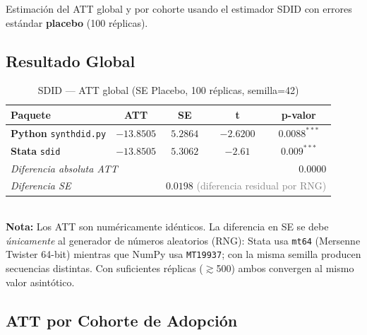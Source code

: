 \documentclass[11pt, a4paper]{article}
\newcommand{\py}{\textcolor{pyblue}{\textbf{Python}}}
\newcommand{\st}{\textcolor{stgreen}{\textbf{Stata}}}
\begin{document}
Estimación del ATT global y por cohorte usando el estimador SDID con errores estándar \textbf{placebo} (100 réplicas).

\subsection{Resultado Global}

\begin{table}[H]
\centering
\caption{SDID --- ATT global (SE Placebo, 100 réplicas, semilla=42)}
\begin{tabular}{lcccc}
\toprule
\textbf{Paquete} & \textbf{ATT} & \textbf{SE} & \textbf{t} & \textbf{p-valor} \\
\midrule
\rowcolor{headgray}
\py{} \texttt{synthdid.py} & $-13.8505$ & $5.2864$ & $-2.6200$ & $0.0088^{***}$ \\
\st{} \texttt{sdid}         & $-13.8505$ & $5.3062$ & $-2.61$   & $0.009^{***}$ \\
\midrule
\multicolumn{2}{l}{\textit{Diferencia absoluta ATT}} & \multicolumn{3}{r}{$0.0000$} \\
\multicolumn{2}{l}{\textit{Diferencia SE}} & \multicolumn{3}{r}{$0.0198$ \textcolor{gray}{(diferencia residual por RNG)}} \\
\bottomrule
\end{tabular}\\[0.4em]
{\small \textbf{Nota:} Los ATT son numéricamente idénticos. La diferencia en SE se debe \textit{únicamente} al generador de números aleatorios (RNG): Stata usa \texttt{mt64} (Mersenne Twister 64-bit) mientras que NumPy usa \texttt{MT19937}; con la misma semilla producen secuencias distintas. Con suficientes réplicas ($\gtrsim$500) ambos convergen al mismo valor asintótico.}
\end{table}

\subsection{ATT por Cohorte de Adopción}
\end{document}
